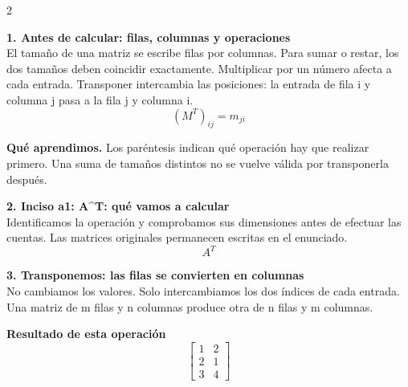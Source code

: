 \documentclass[11pt,a4paper,landscape]{article}
\begin{document}
\begin{multicols*}{2}
\noindent\begin{minipage}{\linewidth}\textbf{1. Antes de calcular: filas, columnas y operaciones}\\[2pt]El tamaño de una matriz se escribe filas por columnas. Para sumar o restar, los dos tamaños deben coincidir exactamente. Multiplicar por un número afecta a cada entrada. Transponer intercambia las posiciones: la entrada de fila i y columna j pasa a la fila j y columna i.
\[(M^T)_{ij}=m_{ji}\]
\par\smallskip\textbf{Qué aprendimos.} Los paréntesis indican qué operación hay que realizar primero. Una suma de tamaños distintos no se vuelve válida por transponerla después.
\end{minipage}\par\medskip
\noindent\begin{minipage}{\linewidth}\textbf{2. Inciso a1: A\textasciicircum{}T: qué vamos a calcular}\\[2pt]Identificamos la operación y comprobamos sus dimensiones antes de efectuar las cuentas. Las matrices originales permanecen escritas en el enunciado.
\[A^T\]
\end{minipage}\par\medskip
\noindent\begin{minipage}{\linewidth}\textbf{3. Transponemos: las filas se convierten en columnas}\\[2pt]No cambiamos los valores. Solo intercambiamos los dos índices de cada entrada. Una matriz de m filas y n columnas produce otra de n filas y m columnas.
\par{}\par\smallskip
\par\smallskip \textbf{Resultado de esta operación}\[\begin{bmatrix}1 & 2\\2 & 1\\3 & 4\end{bmatrix}\]

\end{minipage}
\end{multicols*}
\end{document}
